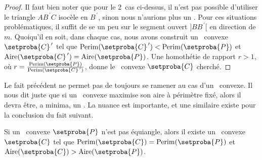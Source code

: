 \begin{proof}
	Il faut bien noter que pour le 2\ieme\ cas ci-dessus, il n'est pas possible d'utiliser le triangle $AB^{\,\prime}C$ isocèle en $B^{\,\prime}$, sinon nous n'aurions plus un \ngone.
	Pour ces situations problématiques, il suffit de se  un peu sur le segment ouvert $]BB^{\,\prime}[$ en direction de $m$.
	Quoiqu'il en soit, dans chaque cas, nous avons construit un \ngone\ convexe $\primeit{\setproba{C}}$ tel que
	$\perim{\primeit{\setproba{C}}} < \perim{\setproba{P}}$
	et
	$\area{\primeit{\setproba{C}}} = \area{\setproba{P}}$.
	Une homothétie de rapport $r > 1$, où $r = \frac{ \perim{\setproba{P}} }{ \perim{\primeit{\setproba{C}}} }$, donne le \ngone\ convexe $\setproba{C}$ cherché.
\end{proof}


\begin{remark}
	Le fait précédent ne permet pas de toujours se ramener au cas d'un \nequi\ convexe. Il nous dit juste que si un \ngone\ convexe maximise son aire à périmètre fixé, alors il devra être, a minima, un \nequi. La nuance est importante, et une similaire existe pour la conclusion du fait suivant.
\end{remark}




\begin{fact} \label{must-be-iso}
	Si un \nequi\ convexe $\setproba{P}$ n'est pas équiangle,
	alors il existe un \ngone\ convexe $\setproba{C}$ tel que
	$\perim{\setproba{C}} = \perim{\setproba{P}}$
	et
	$\area{\setproba{C}} > \area{\setproba{P}}$.
\end{fact}


